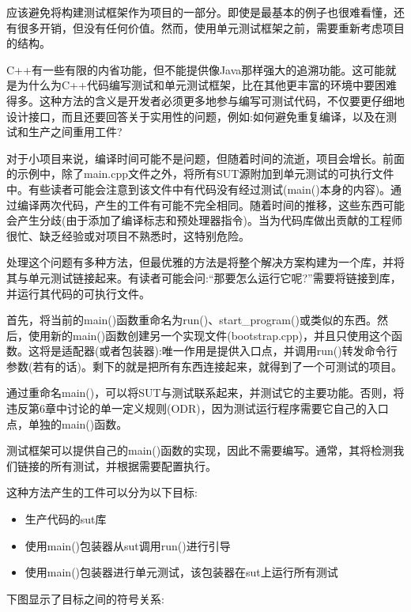 应该避免将构建测试框架作为项目的一部分。即使是最基本的例子也很难看懂，还有很多开销，但没有任何价值。然而，使用单元测试框架之前，需要重新考虑项目的结构。


C++有一些有限的内省功能，但不能提供像Java那样强大的追溯功能。这可能就是为什么为C++代码编写测试和单元测试框架，比在其他更丰富的环境中要困难得多。这种方法的含义是开发者必须更多地参与编写可测试代码，不仅要更仔细地设计接口，而且还要回答关于实用性的问题，例如:如何避免重复编译，以及在测试和生产之间重用工件?

对于小项目来说，编译时间可能不是问题，但随着时间的流逝，项目会增长。前面的示例中，除了main.cpp文件之外，将所有SUT源附加到单元测试的可执行文件中。有些读者可能会注意到该文件中有代码没有经过测试(main()本身的内容)。通过编译两次代码，产生的工件有可能不完全相同。随着时间的推移，这些东西可能会产生分歧(由于添加了编译标志和预处理器指令)。当为代码库做出贡献的工程师很忙、缺乏经验或对项目不熟悉时，这特别危险。

处理这个问题有多种方法，但最优雅的方法是将整个解决方案构建为一个库，并将其与单元测试链接起来。有读者可能会问:“那要怎么运行它呢?”需要将链接到库，并运行其代码的可执行文件。

首先，将当前的main()函数重命名为run()、start\_program()或类似的东西。然后，使用新的main()函数创建另一个实现文件(bootstrap.cpp)，并且只使用这个函数。这将是适配器(或者包装器):唯一作用是提供入口点，并调用run()转发命令行参数(若有的话)。剩下的就是把所有东西连接起来，就得到了一个可测试的项目。

通过重命名main()，可以将SUT与测试联系起来，并测试它的主要功能。否则，将违反第6章中讨论的单一定义规则(ODR)，因为测试运行程序需要它自己的入口点，单独的main()函数。

测试框架可以提供自己的main()函数的实现，因此不需要编写。通常，其将检测我们链接的所有测试，并根据需要配置执行。

这种方法产生的工件可以分为以下目标:

\begin{itemize}
\item 
生产代码的sut库

\item 
使用main()包装器从sut调用run()进行引导

\item 
使用main()包装器进行单元测试，该包装器在sut上运行所有测试
\end{itemize}

下图显示了目标之间的符号关系:

